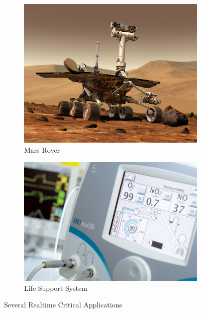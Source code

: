 \begin{figure}
\begin{subfigure}{.5\textwidth}
  \centering
  \includegraphics[width=.9\linewidth]{images/ROVER.jpg}
  \caption{Mars Rover}
  \label{fig:sfigROVER}
\end{subfigure} %
\begin{subfigure}{.5\textwidth}
  \centering
  \includegraphics[width= 0.9\linewidth]{images/LSS.jpg}
  \caption{Life Support System}
  \label{fig:sfigLSS}
\end{subfigure} 

\caption{Several Realtime Critical Applications}
\label{fig:fig}
\end{figure}

